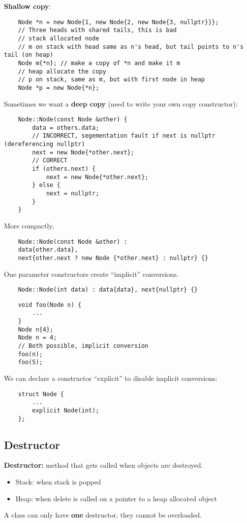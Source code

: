 \textbf{Shallow copy}:
\begin{lstlisting}
    Node *n = new Node{1, new Node{2, new Node{3, nullptr}}};
    // Three heads with shared tails, this is bad
    // stack allocated node
    // m on stack with head same as n's head, but tail points to n's tail (on heap)
    Node m{*n}; // make a copy of *n and make it m
    // heap allocate the copy
    // p on stack, same as m, but with first node in heap
    Node *p = new Node{*n};
\end{lstlisting}
Sometimes we want a \textbf{deep copy} (need to write your own copy constructor):
\begin{lstlisting}
    Node::Node(const Node &other) {
        data = others.data;
        // INCORRECT, segementation fault if next is nullptr (dereferencing nullptr)
        next = new Node{*other.next};
        // CORRECT
        if (others.next) {
            next = new Node{*other.next};
        } else {
            next = nullptr;
        }
    }
\end{lstlisting}
More compactly,
\begin{lstlisting}
    Node::Node(const Node &other) :
    data{other.data},
    next{other.next ? new Node {*other.next} : nullptr} {}
\end{lstlisting}

One parameter constructors create ``implicit'' conversions.
\begin{lstlisting}
    Node::Node(int data) : data{data}, next{nullptr} {}
\end{lstlisting}

\begin{lstlisting}
    void foo(Node n) {
        ...
    }
    Node n{4};
    Node n = 4;
    // Both possible, implicit conversion
    foo(n);
    foo(5);
\end{lstlisting}
We can declare a constructor ``explicit'' to disable implicit conversions:
\begin{lstlisting}
    struct Node {
        ...
        explicit Node(int);
    };
\end{lstlisting}

\subsection{Destructor}
\textbf{Destructor:} method that gets called when objects are destroyed.
\begin{itemize}
    \item Stack: when stack is popped
    \item Heap: when delete is called on a pointer to a heap allocated object
\end{itemize}
A class can only have \textbf{one} destructor, they cannot be overloaded.

